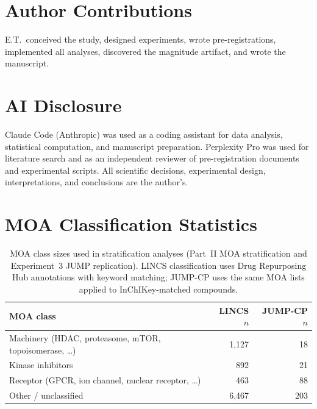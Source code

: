 \documentclass[11pt]{article}
\begin{document}
\section*{Author Contributions}

E.T.\ conceived the study, designed experiments, wrote
pre-registrations, implemented all analyses, discovered the magnitude
artifact, and wrote the manuscript.

\section*{AI Disclosure}

Claude Code (Anthropic) was used as a coding assistant for data
analysis, statistical computation, and manuscript preparation.
Perplexity Pro was used for literature search and as an independent
reviewer of pre-registration documents and experimental scripts.
All scientific decisions, experimental design, interpretations, and
conclusions are the author's.




\appendix

\section{MOA Classification Statistics}
\label{app:moa}

\begin{table}[h]
\centering
\caption{MOA class sizes used in stratification analyses
(Part~II MOA stratification and Experiment~3 JUMP replication). LINCS
classification uses Drug Repurposing Hub annotations with keyword
matching; JUMP-CP uses the same MOA lists applied to
InChIKey-matched compounds.}
\label{tab:moa-narrow}
\begin{tabular}{lrr}
\toprule
MOA class & LINCS $n$ & JUMP-CP $n$ \\
\midrule
Machinery (HDAC, proteasome, mTOR, topoisomerase, \ldots) & 1{,}127 & 18 \\
Kinase inhibitors & 892 & 21 \\
Receptor (GPCR, ion channel, nuclear receptor, \ldots) & 463 & 88 \\
Other / unclassified & 6{,}467 & 203 \\
\bottomrule
\end{tabular}
\end{table}
\end{document}
